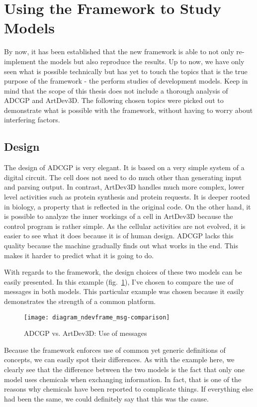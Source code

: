 \section{Using the Framework to Study Models}
By now, it has been established that the new framework is able to not only re-implement the models but also reproduce the results. Up to now, we have only seen what is possible technically but has yet to touch the topics that is the true purpose of the framework - the perform studies of development models. Keep in mind that the scope of this thesis does not include a thorough analysis of ADCGP and ArtDev3D. The following chosen topics were picked out to demonstrate what is possible with the framework, without having to worry about interfering factors.


\subsection{Design}
The design of ADCGP is very elegant. It is based on a very simple system of a digital circuit. The cell does not need to do much other than generating input and parsing output. In contrast, ArtDev3D handles much more complex, lower level activities such as protein synthesis and protein requests. It is deeper rooted in biology, a property that is reflected in the original code. On the other hand, it is possible to analyze the inner workings of a cell in ArtDev3D because the control program is rather simple. As the cellular activities are not evolved, it is easier to see what it does because it is of human design. ADCGP lacks this quality because the machine gradually finds out what works in the end. This makes it harder to predict what it is going to do.

With regards to the framework, the design choices of these two models can be easily presented. In this example (fig.~\ref{fig:diagram_ndevframe_msg-comparison}), I've chosen to compare the use of messages in both models. This particular example was chosen because it easily demonstrates the strength of a common platform.

\begin{figure}[!ht]
	\centering
	\texttt{[image: diagram\_ndevframe\_msg-comparison]}
	\caption{ADCGP vs. ArtDev3D: Use of messages}
	\label{fig:diagram_ndevframe_msg-comparison}
\end{figure}

Because the framework enforces use of common yet generic definitions of concepts, we can easily spot their differences. As with the example here, we clearly see that the difference between the two models is the fact that only one model uses chemicals when exchanging information. In fact, that is one of the reasons why chemicals have been reported to complicate things. If everything else had been the same, we could definitely say that this was the cause.


